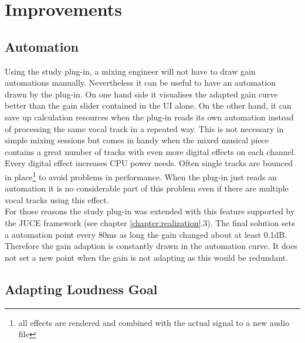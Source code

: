 \chapter{Improvements}
\label{chapter:improvements}

\section{Automation}

Using the study plug-in, a mixing engineer will not have to draw gain automations manually. Nevertheless it can be useful to have an automation drawn by the plug-in. On one hand side it visualises the adapted gain curve better than the gain slider contained in the UI alone. On the other hand, it can save up calculation resources when the plug-in reads its own automation instead of processing the same vocal track in a repeated way. This is not necessary in simple mixing sessions but comes in handy when the mixed musical piece contains a great number of tracks with even more digital effects on each channel. Every digital effect increases CPU power needs. Often single tracks are bounced in place\footnote{all effects are rendered and combined with the actual signal to a new audio file} to avoid problems in performance. When the plug-in just reads an automation it is no considerable part of this problem even if there are multiple vocal tracks using this effect.\\
For those reasons the study plug-in was extended with this feature supported by the JUCE framework (see chapter \ref{chapter:realization}.3).
The final solution sets a automation point every 80ms as long the gain changed about at least 0.1dB. Therefore the gain adaption is constantly drawn in the automation curve. It does not set a new point when the gain is not adapting as this would be redundant.\\

\section{Adapting Loudness Goal}

